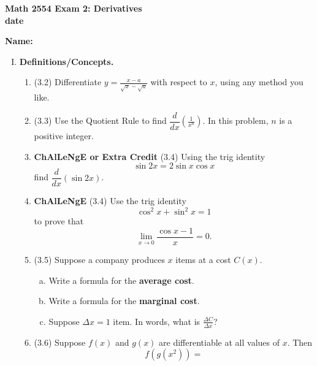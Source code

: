 \documentclass[11pt,letterpaper]{article}
\begin{document}
\flushleft
\begin{multicols}{2}

\begin{large}\textbf{Math 2554 Exam  2: Derivatives \\
date}\end{large}

\hfill\textbf{Name:  }\underline{\hspace{40ex}} %

\vspace{.5in}

\end{multicols}

\pagestyle{empty}

\flushleft

\begin{enumerate}[I.]
\item  \textbf{Definitions/Concepts.} 
	\begin{enumerate}[1.]
	\item (3.2) Differentiate $\displaystyle y=\frac{x-a}{\sqrt{x}-\sqrt{a}}$ with respect to $x$, using any method you like.
	
	\item (3.3) Use the Quotient Rule to find $\displaystyle\dfrac{d}{dx}\left(\frac{1}{x^n}\right)$.  In this problem, $n$ is a positive integer.
	
	\item {\bf ChAlLeNgE or Extra Credit} (3.4) Using the trig identity 
	\[\sin{2x}=2\sin x\cos x\]
	find $\displaystyle\dfrac{d}{dx}\left(\sin{2x}\right)$.
		
	\item {\bf ChAlLeNgE} (3.4) Use the trig identity
	\[\cos^2x+\sin^2x=1\] 
	to prove that 
	\[\lim_{x\to 0}\frac{\cos x-1}{x}=0.\]

	\item (3.5) Suppose a company produces $x$ items at a cost $C(x)$.
		\begin{enumerate}[(a)]
		\item Write a formula for the {\bf average cost}.
		\item Write a formula for the {\bf marginal cost}.
		\item Suppose $\Delta x=1$ item.  In words, what is $\displaystyle\frac{\Delta C}{\Delta x}$?
		\end{enumerate}
		
	\item (3.6) Suppose $f(x)$ and $g(x)$ are differentiable at all values of $x$.  Then 
	\[f(g(x^2))=\]	
	

\end{enumerate}
\end{enumerate}
\end{document}

